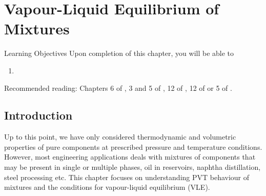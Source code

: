 \chapter{Vapour-Liquid Equilibrium of Mixtures}\label{Chapter:VLE}


   \begin{LearningObjectivesBlock}{Learning Objectives}
      Upon completion of this chapter, you will be able to
        \begin{enumerate}
           \item 
        \end{enumerate}
\medskip
     Recommended reading: Chapters 6 of \citet{SmithVanNess_Book}, 3 and 5 of \citet{Lue_Book}, 12 of \citet{Balmer_Book}, 12 of \citet{Borgnakke_Book} or 5 of \citet{Atkins_Book}.
   \end{LearningObjectivesBlock}


\begin{comment}
   \begin{LearningObjectivesBlock}{Learning Objectives}
      Upon completion of this chapter, you will be able to
        \begin{enumerate}
           \item {\bf Knowledge:} Define, Name, Select, State 
           \item {\bf Comprehension:} Describe, Identify, Discuss
           \item {\bf Application:} Apply, Demonstrate, Employ, Sketch
           \item {\bf Analysis:} Analyse, Compare, Calculate, Solve
           \item {\bf Synthesis:} Determine, Formulate
           \item {\bf Evaluation:} Assess, Check, Estimate, Compare, Measure, Monitor
        \end{enumerate}
\end{comment}

\localtableofcontents
   

\section{Introduction}\label{Chapter:VLE:Section:Introduction}
Up to this point, we have only considered thermodynamic and volumetric properties of pure components at prescribed pressure and temperature conditions. However, most engineering applications deals with mixtures of components that may be present in single or multiple phases, \eg oil in reservoirs, naphtha distillation, steel processing etc. This chapter focuses on understanding PVT behaviour of mixtures and the conditions for vapour-liquid equilibrium (VLE).



